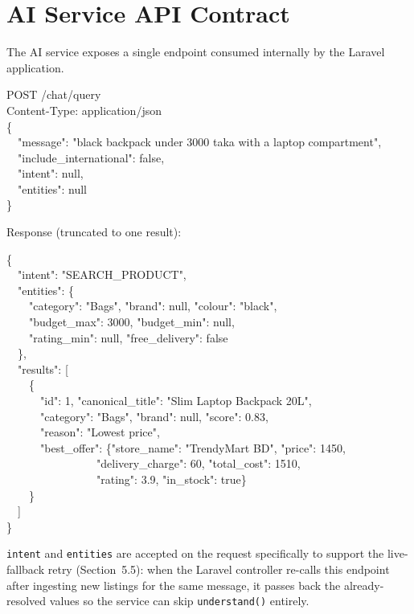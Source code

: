 \documentclass[12pt,a4paper]{report}
\newcommand{\codebox}[1]{%
  \par\noindent\colorbox{codebg}{%
    \begin{minipage}{\dimexpr\linewidth-2\fboxsep}
      \ttfamily\small\color{codeink}
      #1
    \end{minipage}%
  }\par\vspace{6pt}
}
\begin{document}
\appendix
\chapter{AI Service API Contract}
The AI service exposes a single endpoint consumed internally by the Laravel application.

\codebox{%
POST /chat/query\\
Content-Type: application/json\\[4pt]
\{\\
\ \ "message": "black backpack under 3000 taka with a laptop compartment",\\
\ \ "include\_international": false,\\
\ \ "intent": null,\\
\ \ "entities": null\\
\}
}

\noindent Response (truncated to one result):

\codebox{%
\{\\
\ \ "intent": "SEARCH\_PRODUCT",\\
\ \ "entities": \{\\
\ \ \ \ "category": "Bags", "brand": null, "colour": "black",\\
\ \ \ \ "budget\_max": 3000, "budget\_min": null,\\
\ \ \ \ "rating\_min": null, "free\_delivery": false\\
\ \ \},\\
\ \ "results": [\\
\ \ \ \ \{\\
\ \ \ \ \ \ "id": 1, "canonical\_title": "Slim Laptop Backpack 20L",\\
\ \ \ \ \ \ "category": "Bags", "brand": null, "score": 0.83,\\
\ \ \ \ \ \ "reason": "Lowest price",\\
\ \ \ \ \ \ "best\_offer": \{"store\_name": "TrendyMart BD", "price": 1450,\\
\ \ \ \ \ \ \ \ \ \ \ \ \ \ \ \ "delivery\_charge": 60, "total\_cost": 1510,\\
\ \ \ \ \ \ \ \ \ \ \ \ \ \ \ \ "rating": 3.9, "in\_stock": true\}\\
\ \ \ \ \}\\
\ \ ]\\
\}
}

\noindent \texttt{intent} and \texttt{entities} are accepted on the request specifically to support the
live-fallback retry (Section~5.5): when the Laravel controller re-calls this endpoint after ingesting new
listings for the same message, it passes back the already-resolved values so the service can skip
\texttt{understand()} entirely.
\end{document}
